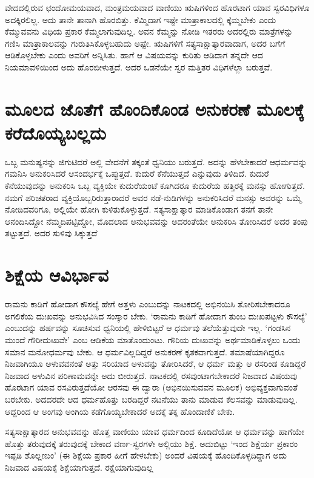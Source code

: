 ವೇದದಲ್ಲಿರುವ ಛಂದೋಮಯವಾದ, ಮಂತ್ರಮಯವಾದ ವಾಣಿಯು ಋಷಿಗಳಿಂದ ಹೊರಟಾಗ ಯಾವ ಸ್ವರವಿಧಿಗಳೂ ಅದಕ್ಕಿರಲಿಲ್ಲ. ಅದು ತಾನೇ ತಾನಾಗಿ ಹೊರಬಿತ್ತು. ಕೆಮ್ಮಿದಾಗ ಇಷ್ಟೇ ಮಾತ್ರಾಕಾಲದಲ್ಲಿ  ಕ್ಕೆಮ್ಮಬೇಕು ಎಂದು ಕೆಮ್ಮುವವನು ವಿಧಿಯ ಪ್ರಕಾರ ಕೆಮ್ಮಲಾಗುವುದಿಲ್ಲ. ಅವನ ಕೆಮ್ಮನ್ನು ನೋಡಿ ಇತರರು ಅದರಲ್ಲಿರು ಮಾತ್ರೆಗಳನ್ನು  ಗಣಿಸಿ ಮಾತ್ರಾಕಾಲವನ್ನು  ಗುರುತಿಸಿಕೊಳ್ಳಬಹುದು ಅಷ್ಟೇ. ಋಷಿಗಳಿಗೆ ಸತ್ಯಸಾಕ್ಷಾತ್ಕಾರವಾದಾಗ, ಅದರ ಬಗೆಗೆ ಆಡಿಕೊಳ್ಳಬೇಕು  ಎಂದು ಅವರಿಗೆ ಅನ್ನಿಸಿತು. ಹಾಗೆ ಆ ವಿಷಯವನ್ನು ಕುರಿತು ಆಡಿದಾಗ ತನ್ನದೇ ಆದ ನಿಯಮಾವಳಿಯಿಂದ ಅದು ಹೊರಬೀಳುತ್ತದೆ. ಅದರ ಒಡನೆಯೇ ಸ್ವರ ಮತ್ತಿತರ ವಿಧಿಗಳೆಲ್ಲಾ ಬರುತ್ತವೆ.

\section*{ಮೂಲದ ಜೊತೆಗೆ ಹೊಂದಿಕೊಂಡ ಅನುಕರಣೆ ಮೂಲಕ್ಕೆ  ಕರೆದೊಯ್ಯಬಲ್ಲದು}

ಒಬ್ಬ ಮನುಷ್ಯನನ್ನು ಜಿಗುಟಿದರೆ ಅಲ್ಲಿ ವೇದನೆಗೆ ತಕ್ಕಂತೆ ಧ್ವನಿಯು ಬರುತ್ತದೆ. ಅದನ್ನು ಹೆಳಬೇಕಾದರೆ ಆಧರ್ಮವನ್ನು ಗಮನಿಸಿ ಅನುಕರಿಸಿದರೆ ಆಸಂದರ್ಭಕ್ಕೆ  ಒಪ್ಪುತ್ತದೆ. ಕುದುರೆ ಕೆನೆಯುತ್ತದೆ ಎನ್ನುವುದು ತಿಳಿದಿದೆ. ಕುದುರೆ ಕೆನೆಯುವುದನ್ನು ಅನುಕರಿಸಿ ಒಬ್ಬ ವ್ಯಕ್ತಿಯೇ ಕುದುರೆಯಂಟೆ ಕೂಗಿದರೂ ಕುದುರೆಯ ಹತ್ತಿರಕ್ಕೆ ಮನಸ್ಸು  ಹೋಗುತ್ತದೆ. ನಮಗೆ ಪರಿಚತರಾದ ವ್ಯಕ್ತಿಯೊಬ್ಬರಿರುತ್ತಾರಾದರೆ ಅವರ ನಡೆ-ನುಡಿಗಳನ್ನು ಅನುಕರಿಸಿದರೆ ಮನಸ್ಸು ಅವರನ್ನು ಒಮ್ಮೆ  ನೋಡಿದವರಿಗೂ, ಅಲ್ಲಿಯೇ ಹೋಗಿ ಕುಳಿತುಕೊಳ್ಳುತ್ತದೆ. ಸತ್ಯಸಾಕ್ಷಾತ್ಕಾರ ಮಾಡಿಕೊಂಡಾಗ ತನಗೆ ತಾನೇ ಆನಂದಿಸಿದ್ದೋ ನೆಮ್ಮದಿಪಟ್ಟಿದ್ದೋ, ಮೊದಲಾದ ಅನುಭವವನ್ನು  ಅದರಂತೆಯೇ ಅನುಕರಿಸಿ ತೋರಿಸಿದರೆ ಅದರ ತಂಪು ತಟ್ಟುತ್ತದೆ. ಅದರ ಸುಳಿವು ಸಿಕ್ಕುತ್ತದೆ

\section*{ಶಿಕ್ಷೆಯ ಆವಿರ್ಭಾವ}

ರಾಮನು ಕಾಡಿಗೆ ಹೋದಾಗ  ಕೌಸಲ್ಯೆ  ಹೇಗೆ ಅತ್ತಳು ಎಂಬುದನ್ನು ನಾಟಕದಲ್ಲಿ ಅಭಿನಯಿಸಿ ತೋರಿಸಬೇಕಾದರೂ ಅಗಲಿಕೆಯ ದುಃಖವನ್ನು ಅನುಭವಿಸಿದ ಸಂಸ್ಕಾರ ಬೇಕು. `ರಾಮನು ಕಾಡಿಗೆ ಹೋದಾಗ ತುಂಬ ದುಃಖಪಟ್ಟಳು ಕೌಸಲ್ಯೆ' ಎಂಬುದನ್ನು  ಹರ್ಷವನ್ನು ಸೂಚಿಸುವ ಧ್ವನಿಯಲ್ಲಿ ಹೇಳಿಬಿಟ್ಟರೆ  ಆ ಧರ್ಮವು ತಲೆಯೆತ್ತುವುದೇ ಇಲ್ಲ. `ಗಂಡಸಿನ ಮುಂದೆ ಗೌರೀದುಃಖವೇ' ಎಂಬ ಆಡಿಕೆಯ ಮಾತೊಂದುಂಟು. ಗೌರಿಯ ದುಃಖವನ್ನು ಅರ್ಥಮಾಡಿಕೊಳ್ಳಲು ಒಂದು ಸಮಾನ ಮನೋಧರ್ಮವು ಬೇಕು. ಆ ಧರ್ಮವಿಲ್ಲದಿದ್ದರೆ ಅನುಕರಣೆ ಕೃತಕವಾಗುತ್ತದೆ. ತಮಾಷೆಯಾಗಿದ್ದರೂ ನಿಜವಾಗಿಯೂ ಅಳುವವನಂತೆ ಅತ್ತು  ಸರಿಯಾದ ಅಳುವನ್ನು  ತೋರಿಸಿದರೆ, ಆ ಧರ್ಮ ಮತ್ತು ಆ ರಸರಿಂಡ ಕೂಡಿದ್ದರೆ ನಿಜವಾದ ಅಳುವಿನ ಪರಿಣಾಮವನ್ನೇ ಅದು ಬೀರುತ್ತದೆ. ನಾಟಕದಲ್ಲಿ ರಸವುಂಟಾಗಬೇಕಾದರೆ ನಿಜವಾದ ವಿಷಯವು ಹೊರಟಾಗ ಯಾವ ರಸವಿರುತ್ತದೆಯೋ ಆರಸವು ಈ ದ್ವಾರಾ (ಅಭಿನಯಿಸುವವನ ಮೂಲಕ) ಅಭಿವ್ಯಕ್ತವಾಗುವಂತೆ ಬರಬೇಕು. ಅದದರದೇ ಆದ ಧರ್ಮಹೊತ್ತು ಬರದಿದ್ದರೆ ನಟನೆಯು ತಾನು ಮಾಡುವ ಕೆಲಸವನ್ನು  ಮಾಡುವುದಿಲ್ಲ. ಆದ್ದರಿಂದ ಆ ಅಂಗವು ಅಂಗಿಯ ಕಡೆಗೊಯ್ಯಬೇಕಾದರೆ ಅದಕ್ಕೆ ತಕ್ಕ ಹೊಂದಾಣಿಕೆ ಬೇಕು. 

ಸತ್ಯಸಾಕ್ಷಾತ್ಕಾರದ ಅನುಭವವನ್ನು  ಹೊತ್ತ ವಾಣಿಯು ಯಾವ ಧರ್ಮದಿಂದ ಕೂಡಿದೆಯೋ ಆ ಧರ್ಮವನ್ನು ಹಾಗೆಯೇ ಹೊತ್ತು ತರುವುದಕ್ಕೆ ತರುವುದಕ್ಕೆ ಬೇಕಾದ ವರ್ಣ-ಸ್ವರಗಳೇ ಅಲ್ಲಿಯು ಶಿಕ್ಷೆ. ಅದುಬಿಟ್ಟು `ಇಂದ ಶಿಕ್ಷೆರ್ಯ ಪ್ರಕಾರಂ ಇಪ್ಪಡಿ ಶೊಲ್ಲಣುಂ' (ಈ ಶಿಕ್ಷೆಯ ಪ್ರಕಾರ ಹೀಗೆ  ಹೇಳಬೇಕು) ಅಂದರೆ ವಿಷಯಕ್ಕೆ  ಹೊಂದಿಕೊಳ್ಳದಿದ್ದಾಗ ಅದು ನಿಜವಾದ ವಿಷಯಕ್ಕೆ ಶಿಕ್ಷೆಯಾಗುತ್ತದೆ. ರಕ್ಷೆಯಾಗುವುದಿಲ್ಲ
 
